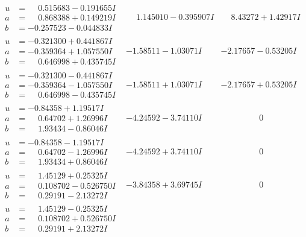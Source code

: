 \documentclass[1p]{elsarticle_modified}
\theoremstyle{definition}
\begin{document}
$$\begin{array}{c|c|c}
\begin{aligned}
u &= \phantom{-}0.515683 - 0.191655 I \\
a &= \phantom{-}0.868388 + 0.149219 I \\
b &= -0.257523 - 0.044833 I\end{aligned}
 & \phantom{-}1.145010 - 0.395907 I & \phantom{-}8.43272 + 1.42917 I \\ \hline\begin{aligned}
u &= -0.321300 + 0.441867 I \\
a &= -0.359364 + 1.057550 I \\
b &= \phantom{-}0.646998 + 0.435745 I\end{aligned}
 & -1.58511 - 1.03071 I & -2.17657 - 0.53205 I \\ \hline\begin{aligned}
u &= -0.321300 - 0.441867 I \\
a &= -0.359364 - 1.057550 I \\
b &= \phantom{-}0.646998 - 0.435745 I\end{aligned}
 & -1.58511 + 1.03071 I & -2.17657 + 0.53205 I \\ \hline\begin{aligned}
u &= -0.84358 + 1.19517 I \\
a &= \phantom{-}0.64702 + 1.26996 I \\
b &= \phantom{-}1.93434 - 0.86046 I\end{aligned}
 & -4.24592 - 3.74110 I & \phantom{-0.000000 } 0 \\ \hline\begin{aligned}
u &= -0.84358 - 1.19517 I \\
a &= \phantom{-}0.64702 - 1.26996 I \\
b &= \phantom{-}1.93434 + 0.86046 I\end{aligned}
 & -4.24592 + 3.74110 I & \phantom{-0.000000 } 0 \\ \hline\begin{aligned}
u &= \phantom{-}1.45129 + 0.25325 I \\
a &= \phantom{-}0.108702 - 0.526750 I \\
b &= \phantom{-}0.29191 - 2.13272 I\end{aligned}
 & -3.84358 + 3.69745 I & \phantom{-0.000000 } 0 \\ \hline\begin{aligned}
u &= \phantom{-}1.45129 - 0.25325 I \\
a &= \phantom{-}0.108702 + 0.526750 I \\
b &= \phantom{-}0.29191 + 2.13272 I\end{aligned}

\end{array}$$
\end{document}
